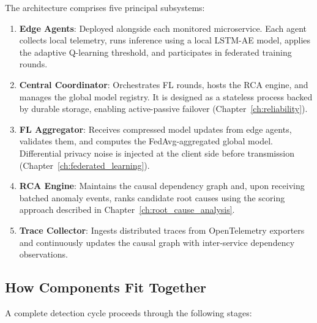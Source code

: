 The architecture comprises five principal subsystems:

\begin{enumerate}
    \item \textbf{Edge Agents}: Deployed alongside each monitored microservice.
    Each agent collects local telemetry, runs inference using a local LSTM-AE
    model, applies the adaptive Q-learning threshold, and participates in
    federated training rounds.

    \item \textbf{Central Coordinator}: Orchestrates FL rounds, hosts the RCA
    engine, and manages the global model registry. It is designed as a
    stateless process backed by durable storage, enabling active-passive
    failover (Chapter~\ref{ch:reliability}).

    \item \textbf{FL Aggregator}: Receives compressed model updates from edge
    agents, validates them, and computes the FedAvg-aggregated global model.
    Differential privacy noise is injected at the client side before
    transmission (Chapter~\ref{ch:federated_learning}).

    \item \textbf{RCA Engine}: Maintains the causal dependency graph and, upon
    receiving batched anomaly events, ranks candidate root causes using the
    scoring approach described in Chapter~\ref{ch:root_cause_analysis}.

    \item \textbf{Trace Collector}: Ingests distributed traces from
    OpenTelemetry exporters and continuously updates the causal graph with
    inter-service dependency observations.
\end{enumerate}

\subsection{How Components Fit Together}
\label{subsec:design_arc_integration}

A complete detection cycle proceeds through the following stages:

